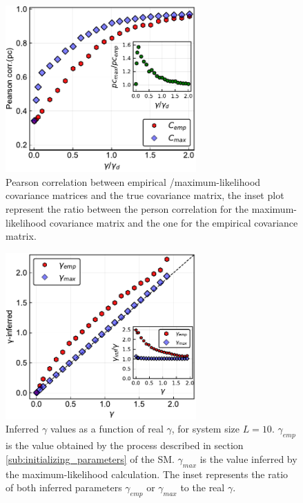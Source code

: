 \documentclass[preprint,amsmath,amssymb,superscriptaddress,showpacs,pre]{revtex4-1}
\begin{document}
\begin{figure}[!htb]
	\centering
	\includegraphics[keepaspectratio=true,width=0.65\textwidth]{Figures/corr_C_L10_balanced_tree_100_rep.pdf}
	\caption{ Pearson correlation between empirical /maximum-likelihood   covariance matrices and the true covariance matrix, the inset plot represent the ratio between the person correlation for the  maximum-likelihood covariance matrix and the one for the empirical covariance matrix.}
	\label{fig:pears_L10}
\end{figure}


\begin{figure}[!htb]
	\centering
	\includegraphics[keepaspectratio=true,width=0.65\textwidth]{Figures/scatter_gamma_L10_100.pdf}
	\caption{Inferred $\gamma$ values as a function of real $\gamma$, for system size $L=10$. $\gamma_{emp}$ is the value obtained by the process described in section \ref{sub:initializing_parameters} of the SM. $\gamma_{max}$ is the value inferred by the maximum-likelihood calculation. 
	The inset represents the ratio of both inferred parameters $\gamma_{emp}$ or $\gamma_{max}$ to the real $\gamma$. }
	\label{fig:scatter_gamma_L10}
\end{figure}
\end{document}
